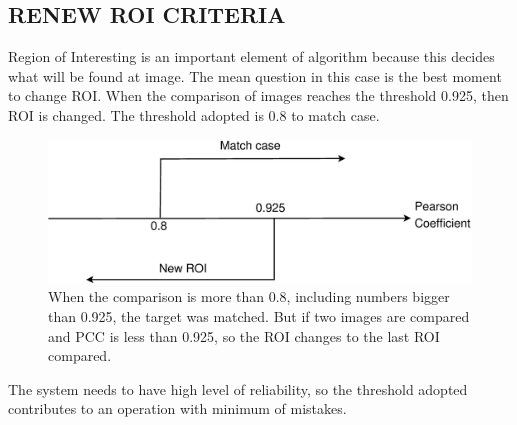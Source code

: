 \subsection{RENEW ROI CRITERIA}
Region of Interesting is an important element of algorithm because this decides 
what will be found at image. The mean question in this case is 
the best moment to change ROI. When the comparison of images reaches the threshold 
0.925, then ROI is changed. The threshold adopted is 0.8 to 
match case\cite{Eugene}.


\begin{figure}[H]
\includegraphics[width=\columnwidth]{images/figure3.eps}
\caption{When the comparison is more than 0.8, including numbers bigger than 
0.925, the target was matched. But if two images are compared 
and PCC is less than 0.925, so the ROI changes to the last ROI compared.}
\end{figure}

The system needs to have high level of reliability, so the threshold adopted 
contributes to an operation with minimum of mistakes.
